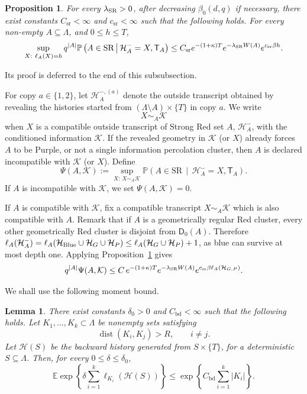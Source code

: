 \documentclass[letterpaper,11pt,reqno]{amsart}
\newtheorem{lem}[thm]{Lemma}
\newtheorem{prop}[thm]{Proposition}
\theoremstyle{definition}
\begin{document}
\begin{prop}
\label{prop:one-block-SR}
For every \(\lambda_{\rm SR}>0\), after decreasing \(\beta_0(d,q)\) if necessary, there exist constants \(C_{\mathrm{sr}}<\infty\) and \(c_{\mathrm{sr}}<\infty\) such that the following holds.  For every non-empty \(A\subseteq\Lambda\), and \(0\le h\le T \),
\[
    \sup_{\substack{X:\ \ell_A(X)=h}}
    q^{|A|}
    \mathbb P\left(
        A\in\mathrm{SR}
        \,\middle|\,
        \mathcal H_A^{-}=X,
        \mathsf T_A
    \right)
    \le
    C_{\mathrm{sr}}
    e^{-(1+\kappa)T}
    e^{-\lambda_{\rm SR} W(A)}
    e^{c_{\mathrm{sr}}\beta h}.
\]
\end{prop}
Its proof is deferred to the end of this subsubsection.


For copy \(a\in\{1,2\}\), let $\mathcal H_A^{-,(a)}$
denote the outside transcript obtained by revealing the histories started from
\((\Lambda\setminus A)\times\{T\}\) in copy \(a\). We write
\[
    X\sim_A \mathcal K
\]
when \(X\) is a compatible outside transcript of Strong Red set $A$, $\mathcal H_A^-$, with the conditioned information \(\mathcal K\). 
If the revealed geometry
in \(\mathcal K\) (or $X$) already forces \(A\) to be Purple, or not a single information percolation cluster, then \(A\) is declared
incompatible with \(\mathcal K\) (or $X$). Define
\[
    \Psi(A,\mathcal K)
    :=
    \sup_{X:\,X\sim_A\mathcal K}
    \mathbb P\left(
        A\in\mathrm{SR}
        \,\middle|\,
        \mathcal H_A^{-}=X,
        \mathsf T_A
    \right).
\]
If \(A\) is incompatible with \(\mathcal K\), we set $\Psi(A,\mathcal K)=0$.


If $A$ is compatible with $\mathcal K$, fix a compatible transcript \(X\sim_A\mathcal K\) which is also compatible with $A$.
Remark that if \(A\) is a geometrically regular Red cluster, every other geometrically Red cluster is disjoint from \({\mathsf D}_0(A)\). Therefore 
$\ell_A(\mathcal H_A^-) =
\ell_A(\mathcal H_{\rm Blue}\cup\mathcal H_G\cup\mathcal H_P)
\leq \ell_A(\mathcal H_G\cup\mathcal H_P)+1$, as blue can survive at most depth one. 
Applying Proposition~\ref{prop:one-block-SR} gives
\begin{equation}\label{eq:activity-pointwise}
q^{|A|}\Psi (A,\mathcal K)
\le
C\,
        e^{-(1+\kappa)T}
        e^{-\lambda_{\rm SR} W(A)}
        e^{c_{\mathrm{sr}}\beta \ell_A(\mathcal H_{G,P})}.
\end{equation}



We shall use the following moment bound.
\begin{lem}
\label{lem:sum-h}
There exist constants \(\delta_0>0\) and \(C_{\mathrm{bd}}<\infty\) such that
the following holds. Let \(K_1,\ldots,K_k\subset\Lambda\) be nonempty sets
satisfying
\[
        \operatorname{dist}(K_i,K_j)>R,
        \qquad i\ne j.
\]
Let \(\mathcal H(S)\) be the backward history generated from \(S\times\{T\}\), for a deterministic
\(S\subseteq\Lambda\).
Then, for every \(0\le\delta\le\delta_0\),
\[
        \mathbb E
        \exp\left\{
        \delta\sum_{i=1}^k \ell_{K_i}(\mathcal H(S))
        \right\}
        \le
        \exp\left\{
        C_{\mathrm{bd}}\sum_{i=1}^k |K_i|
        \right\}.
\]
\end{lem}
\end{document}
